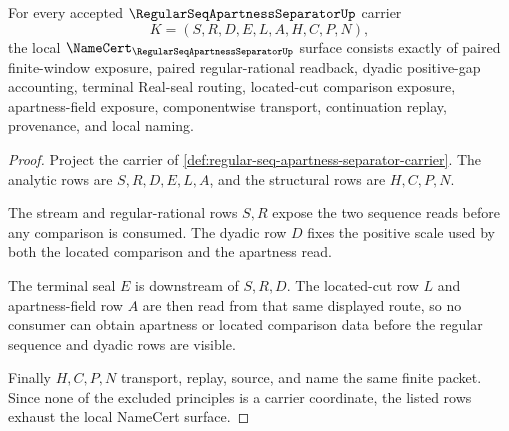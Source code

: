 \begin{theorem}
\label{thm:regular-seq-apartness-separator-obligation-surface}
For every accepted $\RegularSeqApartnessSeparatorUp$ carrier
$$
K=(S,R,D,E,L,A,H,C,P,N),
$$
the local $\NameCert_{\RegularSeqApartnessSeparatorUp}$ surface consists exactly of paired finite-window exposure, paired regular-rational readback, dyadic positive-gap accounting, terminal Real-seal routing, located-cut comparison exposure, apartness-field exposure, componentwise transport, continuation replay, provenance, and local naming.
\end{theorem}
\begin{proof}
Project the carrier of \autoref{def:regular-seq-apartness-separator-carrier}. The analytic rows are $S,R,D,E,L,A$, and the structural rows are $H,C,P,N$.

The stream and regular-rational rows $S,R$ expose the two sequence reads before any comparison is consumed. The dyadic row $D$ fixes the positive scale used by both the located comparison and the apartness read.

The terminal seal $E$ is downstream of $S,R,D$. The located-cut row $L$ and apartness-field row $A$ are then read from that same displayed route, so no consumer can obtain apartness or located comparison data before the regular sequence and dyadic rows are visible.

Finally $H,C,P,N$ transport, replay, source, and name the same finite packet. Since none of the excluded principles is a carrier coordinate, the listed rows exhaust the local NameCert surface.
\end{proof}

